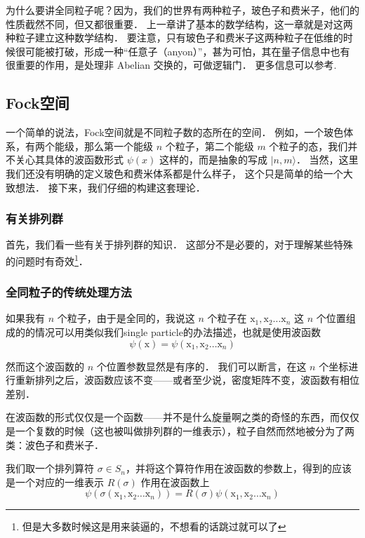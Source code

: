 
为什么要讲全同粒子呢？因为，我们的世界有两种粒子，玻色子和费米子，他们的性质截然不同，但又都很重要． 上一章讲了基本的数学结构，这一章就是对这两种粒子建立这种数学结构． 要注意，只有玻色子和费米子这两种粒子在低维的时候很可能被打破，形成一种“任意子（anyon）”，甚为可怕，其在量子信息中也有很重要的作用，是处理非 Abelian 交换的，可做逻辑门． 更多信息可以参考\cite{Nayak2008}.

\subsection{Fock空间}

一个简单的说法，Fock空间就是不同粒子数的态所在的空间． 例如，一个玻色体系，有两个能级，那么第一个能级 $n$ 个粒子，第二个能级 $m$ 个粒子的态，我们并不关心其具体的波函数形式 $\psi(x)$ 这样的，而是抽象的写成 $|n,m\rangle$． 当然，这里我们还没有明确的定义玻色和费米体系都是什么样子， 这个只是简单的给一个大致想法． 接下来，我们仔细的构建这套理论．

\subsubsection{有关排列群}

首先，我们看一些有关于排列群的知识． 这部分不是必要的，对于理解某些特殊的问题时有奇效\footnote{但是大多数时候这是用来装逼的，不想看的话跳过就可以了}．

\subsubsection{全同粒子的传统处理方法}

如果我有 $n$ 个粒子，由于是全同的，我说这 $n$ 个粒子在 ${\mathrm x}_1, {\mathrm x}_2 \dots {\mathrm x}_n$ 这 $n$ 个位置组成的的情况可以用类似我们single particle的办法描述，也就是使用波函数
\begin{equation}
\psi({\mathrm x}) = \psi({\mathrm x}_1, {\mathrm x}_2\dots {\mathrm x}_n)
\end{equation}

然而这个波函数的 $n$ 个位置参数显然是有序的． 我们可以断言，在这 $n$ 个坐标进行重新排列之后，波函数应该不变——或者至少说，密度矩阵不变，波函数有相位差别．

在波函数的形式仅仅是一个函数——并不是什么旋量啊之类的奇怪的东西，而仅仅是一个复数的时候（这也被叫做排列群的一维表示），粒子自然而然地被分为了两类：波色子和费米子．

我们取一个排列算符 $\sigma\in S_n$，并将这个算符作用在波函数的参数上，得到的应该是一个对应的一维表示 $R(\sigma)$ 作用在波函数上
\begin{equation}
\psi(\sigma ({\mathrm x}_1, {\mathrm x}_2\dots{\mathrm x}_n)) = R(\sigma)\psi({\mathrm x}_1, {\mathrm x}_2\dots{\mathrm x}_n)
\end{equation}

